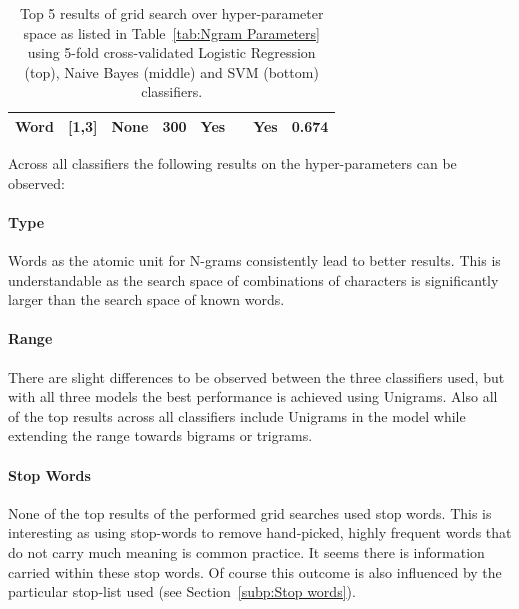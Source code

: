 \begin{table}[h]
\begin{center}
\begin{tabular}{ l l l l l l l l }
    Word & [1,3] & None & 300 & Yes & & Yes & 0.674 \\
    \bottomrule
  \end{tabular}
  \caption{Top 5 results of grid search over hyper-parameter space as listed in Table~\ref{tab:Ngram Parameters} using 5-fold cross-validated Logistic Regression (top), Naive Bayes (middle) and SVM (bottom) classifiers.}
\label{tab:Ngram Grid Search}
\end{center}
\end{table}


Across all classifiers the following results on the hyper-parameters can be observed:

\paragraph{Type}
\label{par:Type}
Words as the atomic unit for N-grams consistently lead to better results. This is understandable as the search space of combinations of characters is significantly larger than the search space of known words.

\paragraph{Range}
\label{par:Range}
There are slight differences to be observed between the three classifiers used, but with all three models the best performance is achieved using Unigrams. Also all of the top results across all classifiers include Unigrams in the model while extending the range towards bigrams or trigrams.

\paragraph{Stop Words}
\label{par:Stop Words}
None of the top results of the performed grid searches used stop words. This is interesting as using stop-words to remove hand-picked, highly frequent words that do not carry much meaning is common practice. It seems there is information carried within these stop words. Of course this outcome is also influenced by the particular stop-list used (see Section~\ref{subp:Stop words}).


